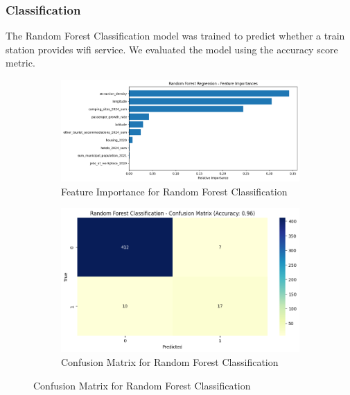 \subsubsection{Classification}
The Random Forest Classification model was trained to predict whether a train station provides wifi service. We evaluated the model using the accuracy score metric.


\begin{figure}[H]
    \centering
    \begin{subfigure}[b]{0.3\textwidth}
        \centering
        \includegraphics[width=\textwidth]{assets/images/random_forest_classification_feature_importance.png}
        \caption{Feature Importance for Random Forest Classification}
        \label{fig:random_forest_classification_feature_importance}
    \end{subfigure}
    \hfill
    \begin{subfigure}[b]{0.3\textwidth}
        \centering
        \includegraphics[width=\textwidth]{assets/images/random_forest_confusion_matrix.png}
        \caption{Confusion Matrix for Random Forest Classification}
        \label{fig:random_forest_classification_confusion}
    \end{subfigure}

\end{figure}
